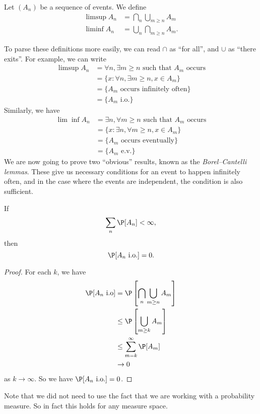 \documentclass[a4paper]{article}
\begin{document}
\begin{defi}\index{$\limsup$}\index{$\liminf$}
  Let $(A_n)$ be a sequence of events. We define
  \begin{align*}
    \limsup A_n &= \bigcap_n \bigcup_{m \geq n} A_m\\
    \liminf A_n &= \bigcup_n \bigcap_{m \geq n} A_m.
  \end{align*}
\end{defi}
To parse these definitions more easily, we can read $\cap$ as ``for all'', and $\cup$ as ``there exits''. For example, we can write
\begin{align*}
  \limsup A_n &= \forall n,\exists m \geq n\text{ such that }A_m\text{ occurs}\\
  &= \{x: \forall n, \exists m \geq n, x \in A_m\}\\
  &= \{A_m\text{ occurs infinitely often}\}\\
  &= \{A_m \text{ i.o.}\}
\end{align*}
Similarly, we have
\begin{align*}
  \lim\inf A_n &= \exists n, \forall m \geq n\text{ such that }A_m\text{ occurs}\\
  &= \{x: \exists n, \forall m \geq n, x \in A_m\}\\
  &= \{A_m\text{ occurs eventually}\}\\
  &= \{A_m\text{ e.v.}\}
\end{align*}
We are now going to prove two ``obvious'' results, known as the \emph{Borel--Cantelli lemmas}. These give us necessary conditions for an event to happen infinitely often, and in the case where the events are independent, the condition is also sufficient.

\begin{lemma}
  If
  \[
    \sum_n \P[A_n] < \infty,
  \]
  then
  \[
    \P[A_n\text{ i.o.}] = 0.
  \]
\end{lemma}

\begin{proof}
  For each $k$, we have
  \begin{align*}
    \P[A_n\text{ i.o}] &= \P\left[\bigcap_n \bigcup_{m \geq n} A_m\right]\\
    &\leq \P\left[\bigcup_{m \geq k} A_m\right]\\
    &\leq \sum_{m = k}^\infty \P[A_m]\\
    &\to 0
  \end{align*}
  as $k \to \infty$. So we have $\P[A_n\text{ i.o.}] = 0$.
\end{proof}
Note that we did not need to use the fact that we are working with a probability measure. So in fact this holds for any measure space.
\end{document}
